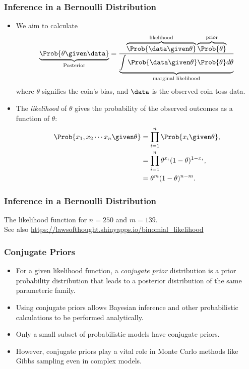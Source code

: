 \documentclass{slides}
\begin{document}
\begin{frame}
	\frametitle{Inference in a Bernoulli Distribution}
	\begin{itemize}
		\item We aim to calculate
		\[
			\underbrace{\Prob{\theta \given \data}}_{\text{Posterior}}
			= 
			\frac{\overbrace{\Prob{\data \given \theta}}^{\text{likelihood}}
				\overbrace{\Prob{\theta}}^{\text{prior}}}
				{\underbrace{\int \Prob{\data \given \theta}\Prob{\theta} d\theta}_{\text{marginal likelihood}}}
		\]
		where $\theta$ signifies the coin's bias, and $\data$ is the observed coin toss data.

	\item The \emph{likelihood} of $\theta$ gives the probability of the observed outcomes as a function of $\theta$:
			\begin{align*}
				\Prob{x_1, x_2\cdots x_n \given \theta} &= \prod_{i=1}^n \Prob{x_i \given \theta},\\
				& = \prod_{i=1}^n \theta^{x_i} (1-\theta)^{1-x_i},\\
				& = \theta^{m} (1-\theta)^{n-m}.
				\label{eq:bernoulli-likelihood}
			\end{align*}
	\end{itemize}
\end{frame}

\begin{frame}
	\frametitle{Inference in a Bernoulli Distribution}
	
		The likelihood function for $n=250$ and $m=139$.\\
		{\small See also \url{https://lawsofthought.shinyapps.io/binomial_likelihood}}

\end{frame}

\begin{frame}
	\frametitle{Conjugate Priors}
	\begin{itemize}
		\item For a given likelihood function, a \emph{conjugate prior} distribution is a prior probability distribution that leads to a posterior distribution of the same parameteric family.
		\item Using conjugate priors allows Bayesian inference and other probabilistic calculations to be performed analytically.
		\item Only a small subset of probabilistic models have conjugate priors.
		\item However, conjugate priors play a vital role in Monte Carlo methods like Gibbs sampling even in complex models.
	\end{itemize}
\end{frame}
\end{document}
